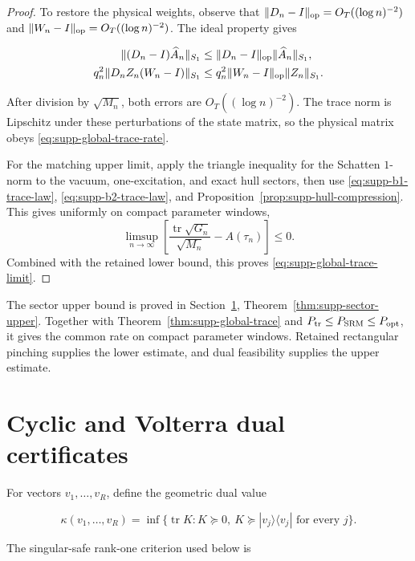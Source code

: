 \begin{proof}
To restore the physical weights, observe that
\(\|D_n-I\|_{\rm op}=O_T((\log n)^{-2})\) and
\(\|W_n-I\|_{\rm op}=O_T((\log n)^{-2})\). The ideal property gives

\begin{align*}
 \|(D_n-I)\widehat A_n\|_{S_1}
 &\le\|D_n-I\|_{\rm op}\|\widehat A_n\|_{S_1},\\
 q_n^2\|D_nZ_n(W_n-I)\|_{S_1}
 &\le q_n^2\|W_n-I\|_{\rm op}\|Z_n\|_{S_1}.
\end{align*}

After division by \(\sqrt{M_n}\), both errors are
\(O_T((\log n)^{-2})\). The trace norm is Lipschitz under these perturbations
of the state matrix, so the physical matrix obeys
\eqref{eq:supp-global-trace-rate}.

For the matching upper limit, apply the triangle inequality for the Schatten
\(1\)-norm to
the vacuum, one-excitation, and exact hull sectors, then use
\eqref{eq:supp-b1-trace-law}, \eqref{eq:supp-b2-trace-law}, and
Proposition~\ref{prop:supp-hull-compression}.  This gives
uniformly on compact parameter windows,
\[
 \limsup_{n\to\infty}
 \left[
  \frac{\operatorname{tr}\sqrt{G_n}}{\sqrt{M_n}}-A(\tau_n)
 \right]
 \le 0.
\]
Combined with the retained lower bound, this proves
\eqref{eq:supp-global-trace-limit}.
\end{proof}

The sector upper bound is proved in
Section~\ref{supp:dual-certificates}, Theorem~\ref{thm:supp-sector-upper}.
Together with Theorem~\ref{thm:supp-global-trace} and
\(P_{\rm tr}\le P_{\rm SRM}\le P_{\rm opt}\), it gives the common rate on
compact parameter windows. Retained rectangular pinching supplies the lower
estimate, and dual feasibility supplies the upper estimate.

\section{Cyclic and Volterra dual certificates}
\label{supp:dual-certificates}

For vectors \(v_1,\ldots,v_R\), define the geometric dual value

\begin{equation}\label{eq:supp-geometric-dual}
 \kappa(v_1,\ldots,v_R)=
 \inf\{\operatorname{tr}K:K\succeq0,\ K\succeq|v_j\rangle\langle v_j|
 \text{ for every }j\}.
\end{equation}

The singular-safe rank-one criterion used below is

